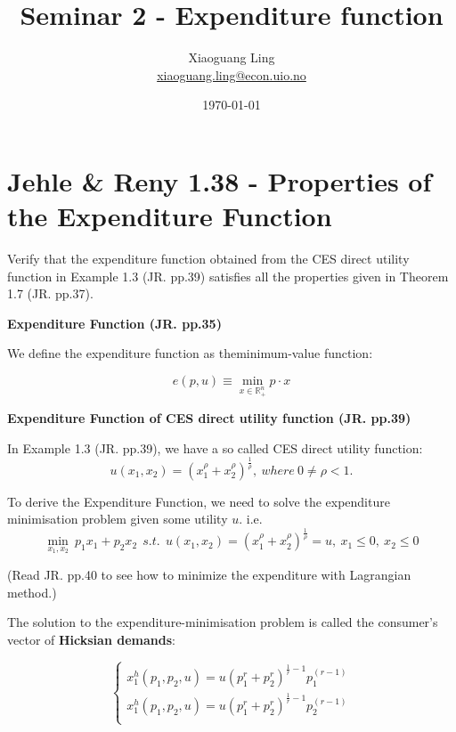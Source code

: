 \documentclass{article}
\title{Seminar 2 - Expenditure function}
\author{Xiaoguang Ling \\  \href{xiaoguang.ling@econ.uio.no}{xiaoguang.ling@econ.uio.no}}
\date{\today}
\newcommand{\R}{\mathbb{R}}
\begin{document}
\maketitle

\section{Jehle \& Reny 1.38 - Properties of the Expenditure Function}
Verify that the expenditure function obtained from the CES direct utility function in Example 1.3 
(JR. pp.39) satisfies all the properties given in Theorem 1.7 (JR. pp.37).

\begin{mdframed}[backgroundcolor=blue!20,linecolor=white]

\textbf{Expenditure Function (JR. pp.35)}

\medskip

We define the expenditure function as theminimum-value function:

$$e(p, u) \equiv \min_{x \in \R^n_+} p \cdot x$$

\textbf{Expenditure Function of CES direct utility function (JR. pp.39)}

\medskip

In Example 1.3 (JR. pp.39), we have a so called CES  direct utility function:
$$u(x_1, x_2) = (x_1^{\rho} + x_2^{\rho})^{\frac{1}{\rho}},\ where \ 0 \ne \rho<1.$$

To derive the Expenditure Function, we need to solve the expenditure minimisation problem
given some utility $u$. i.e.
$$\min_{x_1,x_2} \ p_1x_1 + p_2x_2 \ \ s.t.  \ \ u(x_1, x_2) = (x_1^{\rho} + x_2^{\rho})^{\frac{1}{\rho}} = u, \ x_1 \le 0, \ x_2 \le 0$$

(Read JR. pp.40 to see how to minimize the expenditure with Lagrangian method.)

\medskip

The solution to the expenditure-minimisation problem is called the consumer’s
vector of \textbf{Hicksian demands}:

\begin{equation}
    \begin{cases}
    x_1^h(p_1,p_2,u) = u(p_1^{r} + p_2^{r})^{\frac{1}{r}-1} p_1^{(r-1)} \\	
    x_1^h(p_1,p_2,u) = u(p_1^{r} + p_2^{r})^{\frac{1}{r}-1} p_2^{(r-1)} \\	
    \end{cases}
    \label{eq:1_38_hicks}   
\end{equation}


\end{mdframed}
\end{document}
